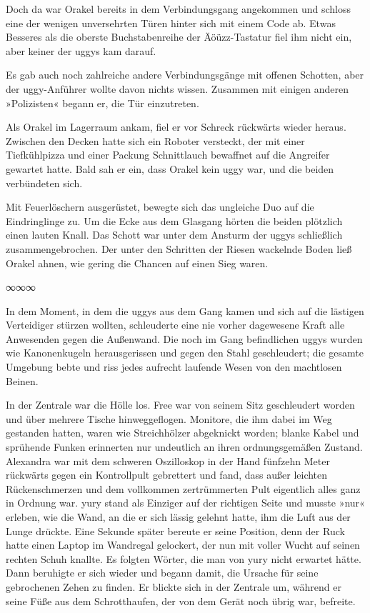 Doch da war Orakel bereits in dem Verbindungsgang angekommen und schloss eine der wenigen unversehrten Türen hinter sich mit einem Code ab. Etwas Besseres als die oberste Buchstabenreihe der Äöüzz-Tastatur fiel ihm nicht ein, aber keiner der uggys kam darauf.

Es gab auch noch zahlreiche andere Verbindungsgänge mit offenen Schotten, aber der uggy-Anführer wollte davon nichts wissen. Zusammen mit einigen anderen »Polizisten« begann er, die Tür einzutreten.

Als Orakel im Lagerraum ankam, fiel er vor Schreck rückwärts wieder heraus. Zwischen den Decken hatte sich ein Roboter versteckt, der mit einer Tiefkühlpizza und einer Packung Schnittlauch bewaffnet auf die Angreifer gewartet hatte. Bald sah er ein, dass Orakel kein uggy war, und die beiden verbündeten sich.

Mit Feuerlöschern ausgerüstet, bewegte sich das ungleiche Duo auf die Eindringlinge zu. Um die Ecke aus dem Glasgang hörten die beiden plötzlich einen lauten Knall. Das Schott war unter dem Ansturm der uggys schließlich zusammengebrochen. Der unter den Schritten der Riesen wackelnde Boden ließ Orakel ahnen, wie gering die Chancen auf einen Sieg waren.

\begin{center}
    ∞∞∞
\end{center}

In dem Moment, in dem die uggys aus dem Gang kamen und sich auf die lästigen Verteidiger stürzen wollten, schleuderte eine nie vorher dagewesene Kraft alle Anwesenden gegen die Außenwand. Die noch im Gang befindlichen uggys wurden wie Kanonenkugeln herausgerissen und gegen den Stahl geschleudert; die gesamte Umgebung bebte und riss jedes aufrecht laufende Wesen von den machtlosen Beinen.

In der Zentrale war die Hölle los. Free war von seinem Sitz geschleudert worden und über mehrere Tische hinweggeflogen. Monitore, die ihm dabei im Weg gestanden hatten, waren wie Streichhölzer abgeknickt worden; blanke Kabel und sprühende Funken erinnerten nur undeutlich an ihren ordnungsgemäßen Zustand. Alexandra war mit dem schweren Oszilloskop in der Hand fünfzehn Meter rückwärts gegen ein Kontrollpult gebrettert und fand, dass außer leichten Rückenschmerzen und dem vollkommen zertrümmerten Pult eigentlich alles ganz in Ordnung war. yury stand als Einziger auf der richtigen Seite und musste »nur« erleben, wie die Wand, an die er sich lässig gelehnt hatte, ihm die Luft aus der Lunge drückte. Eine Sekunde später bereute er seine Position, denn der Ruck hatte einen Laptop im Wandregal gelockert, der nun mit voller Wucht auf seinen rechten Schuh knallte. Es folgten Wörter, die man von yury nicht erwartet hätte. Dann beruhigte er sich wieder und begann damit, die Ursache für seine gebrochenen Zehen zu finden. Er blickte sich in der Zentrale um, während er seine Füße aus dem Schrotthaufen, der von dem Gerät noch übrig war, befreite.

